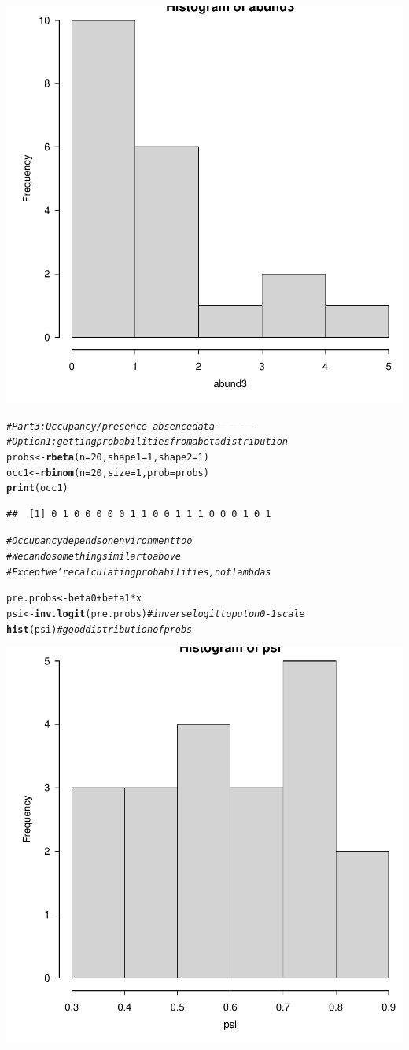 \documentclass{article}\usepackage[]{graphicx}\usepackage[]{color}
\makeatletter
\newcommand{\hlnum}[1]{\textcolor[rgb]{0.686,0.059,0.569}{#1}}%
\newcommand{\hlcom}[1]{\textcolor[rgb]{0.678,0.584,0.686}{\textit{#1}}}%
\newcommand{\hlopt}[1]{\textcolor[rgb]{0,0,0}{#1}}%
\newcommand{\hlstd}[1]{\textcolor[rgb]{0.345,0.345,0.345}{#1}}%
\newcommand{\hlkwb}[1]{\textcolor[rgb]{0.69,0.353,0.396}{#1}}%
\newcommand{\hlkwc}[1]{\textcolor[rgb]{0.333,0.667,0.333}{#1}}%
\newcommand{\hlkwd}[1]{\textcolor[rgb]{0.737,0.353,0.396}{\textbf{#1}}}%
\newenvironment{kframe}{%
 \def\at@end@of@kframe{}%
 \ifinner\ifhmode%
  \def\at@end@of@kframe{\end{minipage}}%
  \begin{minipage}{\columnwidth}%
 \fi\fi%
 \def\FrameCommand##1{\hskip\@totalleftmargin \hskip-\fboxsep
 \colorbox{shadecolor}{##1}\hskip-\fboxsep
     \hskip-\linewidth \hskip-\@totalleftmargin \hskip\columnwidth}%
 \MakeFramed {\advance\hsize-\width
   \@totalleftmargin\z@ \linewidth\hsize
   \@setminipage}}%
 {\par\unskip\endMakeFramed%
 \at@end@of@kframe}
\newenvironment{knitrout}{}{} %
\makeatother
\begin{document}
\begin{knitrout}
{\centering \includegraphics[width=.6\linewidth]{figure/Tutorial08-datasims-S2022-Rnwauto-report-8} 

}


\begin{kframe}\begin{alltt}
\hlcom{# Part 3: Occupancy/presence-absence data ---------------------}
\hlcom{# Option 1: getting probabilities from a beta distribution}
\hlstd{probs} \hlkwb{<-} \hlkwd{rbeta}\hlstd{(}\hlkwc{n} \hlstd{=} \hlnum{20}\hlstd{,} \hlkwc{shape1} \hlstd{=} \hlnum{1}\hlstd{,} \hlkwc{shape2} \hlstd{=} \hlnum{1}\hlstd{)}
\hlstd{occ1} \hlkwb{<-} \hlkwd{rbinom}\hlstd{(}\hlkwc{n} \hlstd{=} \hlnum{20}\hlstd{,} \hlkwc{size} \hlstd{=} \hlnum{1}\hlstd{,} \hlkwc{prob} \hlstd{= probs)}
\hlkwd{print}\hlstd{(occ1)}
\end{alltt}
\begin{verbatim}
##  [1] 0 1 0 0 0 0 0 1 1 0 0 1 1 1 0 0 0 1 0 1
\end{verbatim}
\begin{alltt}
\hlcom{# Occupancy depends on environment too}
\hlcom{# We can do something similar to above}
\hlcom{# Except we're calculating probabilities, not lambdas}

\hlstd{pre.probs} \hlkwb{<-} \hlstd{beta0} \hlopt{+} \hlstd{beta1}\hlopt{*}\hlstd{x}
\hlstd{psi} \hlkwb{<-} \hlkwd{inv.logit}\hlstd{(pre.probs)} \hlcom{# inverse logit to put on 0-1 scale}
\hlkwd{hist}\hlstd{(psi)} \hlcom{# good distribution of probs}
\end{alltt}
\end{kframe}

{\centering \includegraphics[width=.6\linewidth]{figure/Tutorial08-datasims-S2022-Rnwauto-report-9} 

}
\end{knitrout}
\end{document}
